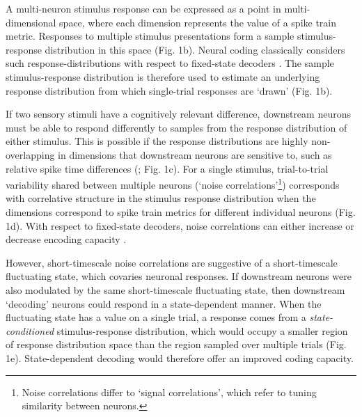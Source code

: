 \documentclass{article}
\begin{document}
A multi-neuron stimulus response can be expressed as a point in multi-dimensional space, where each dimension represents the value of a spike train metric. Responses to multiple stimulus presentations form a sample stimulus-response distribution in this space (Fig. 1b). Neural coding classically considers such response-distributions with respect to fixed-state decoders \cite{averbeck2006neural, moreno2014information, stringer2019high}. The sample stimulus-response distribution is therefore used to estimate an underlying response distribution from which single-trial responses are `drawn' (Fig. 1b).


If two sensory stimuli have a cognitively relevant difference, downstream neurons must be able to respond differently to samples from the response distribution of either stimulus. This is possible if the response distributions are highly non-overlapping in dimensions that downstream neurons are sensitive to, such as relative spike time differences (\cite{gasparini2006state, branco2010dendritic, branco2011synaptic}; Fig. 1c). For a single stimulus, trial-to-trial variability shared between multiple neurons (`noise correlations'\footnote{Noise correlations differ to `signal correlations', which refer to tuning similarity between neurons.}) corresponds with correlative structure in the stimulus response distribution when the dimensions correspond to spike train metrics for different individual neurons (Fig. 1d). With respect to fixed-state decoders, noise correlations can either increase or decrease encoding capacity \cite{averbeck2006neural}.





However, short-timescale noise correlations are suggestive of a short-timescale fluctuating state, which covaries neuronal responses. If downstream neurons were also modulated by the same short-timescale fluctuating state, then downstream `decoding' neurons could respond in a state-dependent manner.
When the fluctuating state has a value on a single trial, a response comes from a \textit{state-conditioned} stimulus-response distribution, which would occupy a smaller region of response distribution space than the region sampled over multiple trials (Fig. 1e). State-dependent decoding would therefore offer an improved coding capacity.
\end{document}
